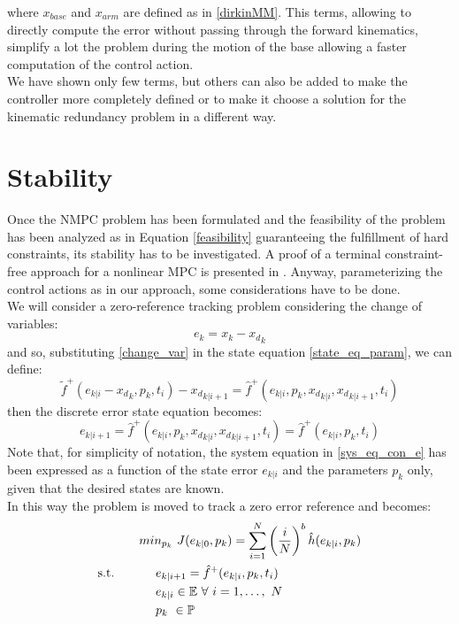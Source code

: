 where $x_{base}$ and $x_{arm}$ are defined as in \ref{dirkinMM}.
This terms, allowing to directly compute the error without passing through the forward kinematics, simplify a lot the problem during the motion of the base allowing a faster computation of the control action.\\We have shown only few terms, but others can also be added to make the controller more completely defined or to make it choose a solution for the kinematic redundancy problem in a different way. 

\section{Stability}\label{stabproof}

Once the NMPC problem has been formulated and the feasibility of the problem has been analyzed as in Equation \ref{feasibility} guaranteeing the fulfillment of hard  constraints, its stability has to be investigated. A proof of a terminal constraint-free approach for a nonlinear MPC is presented in \cite{alamir2018stability}. Anyway, parameterizing the control actions as in our approach, some considerations have to be done. \\
We will consider a zero-reference tracking problem considering the change of variables:
\begin{equation}\label{change_var}
    e_k=x_k-{x_d}_k
\end{equation}
and so, substituting \ref{change_var} in the state equation \ref{state_eq_param}, we can define:
\begin{equation} \label{NLsystem}
	\tilde{f}^+(e_{k|i}-{x_d}_k,p_k,t_i)-{x_d}_{k|i+1}=\hat{f}^+(e_{k|i},p_k,{{x_d}_{k|i}},{{x_d}_{k|i+1}},t_i) 
\end{equation}
then the discrete error state equation becomes:
\begin{equation}\label{sys_eq_con_e}
    e_{k|i+1}=\hat{f}^+(e_{k|i},p_k,{{x_d}_{k|i}},{{x_d}_{k|i+1}},t_i)=\hat{f}^+(e_{k|i},p_k,t_i)
\end{equation}
Note that, for simplicity of notation, the system equation in \ref{sys_eq_con_e} has been expressed as a function of the state error ${e_{k|i}}$ and the parameters $p_k$ only, given that the desired states are known.\\
In this way the problem is moved to track a zero error reference and becomes: 
\begin{equation} \label{ourproblem_stab}
\begin{split}
		& min_{{p}_k}\ J({e}_{k|0},{p}_k) =\sum_{i=1}^{N}\left(\frac{i}{N}\right)^b\hat{h}(e_{k|i},{p}_{k}) \\
		\textnormal{s.t.}\qquad
		&\ \ \ \ e_{k|i+1}=\hat{f}^+(e_{k|i},p_k,t_i) \\
		&\ \ \ \ e_{k|i} \in \mathbb{E}\ \forall\ i=1,\dots,\ N  \\
		&\ \ \ \ {p}_k\   \in \mathbb{P}\ \\
	\end{split}	
\end{equation}
